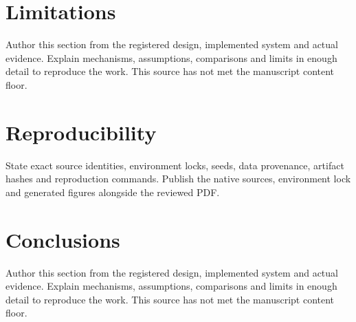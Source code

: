 \documentclass[11pt]{article}
\begin{document}
\section{Limitations}\label{sec:limitations}
Author this section from the registered design, implemented system and actual evidence. Explain mechanisms, assumptions, comparisons and limits in enough detail to reproduce the work. This source has not met the manuscript content floor.

\section{Reproducibility}\label{sec:reproducibility}
State exact source identities, environment locks, seeds, data provenance, artifact hashes and reproduction commands. Publish the native sources, environment lock and generated figures alongside the reviewed PDF.

\section{Conclusions}\label{sec:conclusions}
Author this section from the registered design, implemented system and actual evidence. Explain mechanisms, assumptions, comparisons and limits in enough detail to reproduce the work. This source has not met the manuscript content floor.

% 
% 
\end{document}
